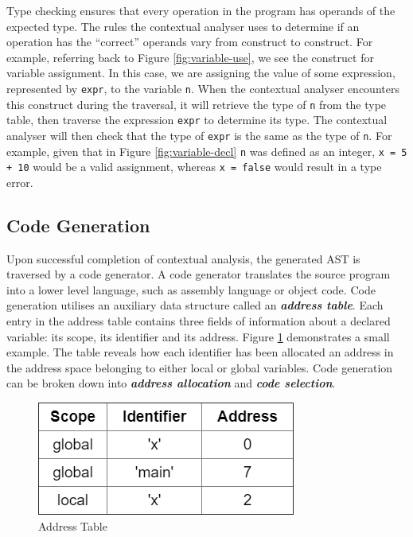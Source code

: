 \documentclass{l4proj}
\begin{document}
Type checking ensures that every operation in the program has operands of the expected type. The rules the contextual analyser uses to determine if an operation has the ``correct'' operands vary from construct to construct. For example, referring back to Figure \ref{fig:variable-use}, we see the construct for variable assignment. In this case, we are assigning the value of some expression, represented by \texttt{expr}, to the variable \texttt{n}. When the contextual analyser encounters this construct during the traversal, it will retrieve the type of \texttt{n} from the type table, then traverse the expression \texttt{expr} to determine its type. The contextual analyser will then check that the type of \texttt{expr} is the same as the type of \texttt{n}. For example, given that in Figure \ref{fig:variable-decl} \texttt{n} was defined as an integer, \texttt{x = 5 + 10} would be a valid assignment, whereas \texttt{x = false} would result in a type error.

\subsection{Code Generation}
Upon successful completion of contextual analysis, the generated AST is traversed by a code generator. A code generator translates the source program into a lower level language, such as assembly language or object code. Code generation utilises an auxiliary data structure called an \textit{\textbf{address table}}. Each entry in the address table contains three fields of information about a declared variable: its scope, its identifier and its address. Figure \ref{fig:address-table} demonstrates a small example. The table reveals how each identifier has been allocated an address in the address space belonging to either local or global variables. Code generation can be broken down into \textit{\textbf{address allocation}} and \textit{\textbf{code selection}}.

\begin{figure}[h]
\centering
\includegraphics[scale=0.5]{images/address-table.png}
\caption{Address Table}
\label{fig:address-table}	
\end{figure}
\end{document}
